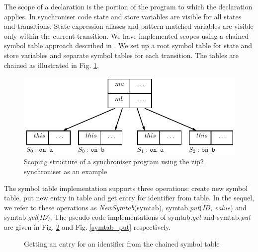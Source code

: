 The scope of a declaration is the portion of the program to which the declaration applies. In synchroniser code state and store variables are visible for all states and transitions. State expression aliases and pattern-matched variables are visible only within the current transition. We have implemented scopes using a chained symbol table approach described in \cite{dragonbook}. We set up a root symbol table for state and store variables and separate symbol tables for each transition. The tables are chained as illustrated in Fig. \ref{fig:symtab_chain}.

  \begin{figure}[h!]
  \centering
  \includegraphics[scale=0.8]{figs/chapter_02_symtab_chain.pdf}
  \caption{Scoping structure of a synchroniser program using the zip2 synchroniser as an example}
  \label{fig:symtab_chain}
  \end{figure}

The symbol table implementation supports three operations: create new symbol table, put new entry in table and get entry for identifier from table. In the sequel, we refer to these operations as \emph{NewSymtab}(symtab), symtab.\emph{put}(\emph{ID, value}) and symtab.\emph{get}(\emph{ID}). The pseudo-code implementations of symtab.\emph{get} and symtab.\emph{put} are given in Fig. \ref{symtab_get} and Fig. \ref{symtab_put} respectively.

\begin{figure}[h!]
\noindent{}
\caption{Getting an entry for an identifier from the chained symbol table\label{symtab_get}}
\end{figure}

